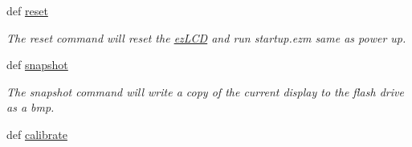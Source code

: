 \begin{DoxyCompactItemize}
def \hyperlink{group___general_gad09d3f52045f116eb41726211f8909a4}{reset}
\begin{DoxyCompactList}\small\item\em The reset command will reset the \hyperlink{classmodule_1_1ez_l_c_d3xx_1_1ez_l_c_d}{ez\-L\-C\-D} and run startup.\-ezm same as power up. \end{DoxyCompactList}\item 
def \hyperlink{group___general_gaf906c49e26bdd7b09f58d80675a0d4f5}{snapshot}
\begin{DoxyCompactList}\small\item\em The snapshot command will write a copy of the current display to the flash drive as a bmp. \end{DoxyCompactList}\item 
\hypertarget{group___general_ga44f3daeee41eaaf35752594e6543a619}{def \hyperlink{group___general_ga44f3daeee41eaaf35752594e6543a619}{calibrate}}\label{dd/d0a/group___general_ga44f3daeee41eaaf35752594e6543a619}


\end{DoxyCompactItemize}
